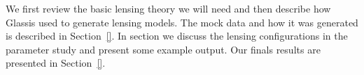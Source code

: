\documentclass[onecolumn,galley]{mn2e}
\newcommand{\Glass}{{\sc Glass}}
\newcommand{\secref}[1] {Section~\ref{#1}}
\begin{document}
We first review the basic lensing theory we will need and then describe how
\Glass is used to generate lensing models. The mock data and how it was
generated is described in \secref{}. In section{} we discuss the lensing
configurations in the parameter study and present some example output. Our
finals results are presented in \secref{}.







\end{document}

